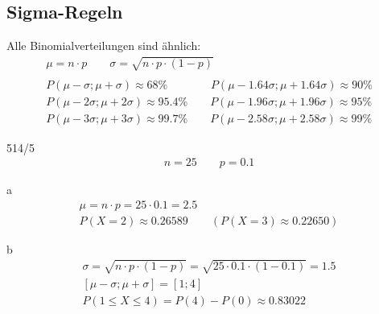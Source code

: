 \subsection{Sigma-Regeln}
Alle Binomialverteilungen sind ähnlich:
\begin{gather*}
  \mu = n \cdot p \qquad \sigma = \sqrt{n \cdot p \cdot (1 - p)} \\\\
  P(\mu - \sigma; \mu + \sigma) \approx 68\% \qquad\quad\;\;\; P(\mu - 1.64\sigma; \mu + 1.64\sigma) \approx 90\% \\
  P(\mu - 2\sigma; \mu + 2\sigma) \approx 95.4\% \qquad P(\mu - 1.96\sigma; \mu + 1.96\sigma) \approx 95\% \\
  P(\mu - 3\sigma; \mu + 3\sigma) \approx 99.7\% \qquad P(\mu - 2.58\sigma; \mu + 2.58\sigma) \approx 99\%
\end{gather*}
\begin{exercise}{514/5}
  \begin{gather*}
    n = 25 \qquad p = 0.1
  \end{gather*}
  \item [a]
  \begin{gather*}
    \mu = n \cdot p = 25 \cdot 0.1 = 2.5 \\
    P(X = 2) \approx 0.26589 \qquad (P(X = 3) \approx 0.22650)
  \end{gather*}
  \item [b]
  \begin{gather*}
    \sigma = \sqrt{n \cdot p \cdot (1 - p)} = \sqrt{25 \cdot 0.1 \cdot (1 - 0.1)} = 1.5 \\
    [\mu - \sigma; \mu + \sigma] = [1; 4] \\
    P(1 \leq X \leq 4) = P(4) - P(0) \approx 0.83022
  \end{gather*}
\end{exercise}
